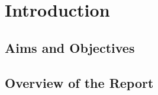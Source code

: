 \chapter{Introduction}\label{ch:introduction}

\section{Aims and Objectives}\label{sec:aims-and-objectives}

\section{Overview of the Report}\label{sec:overview-of-report}

